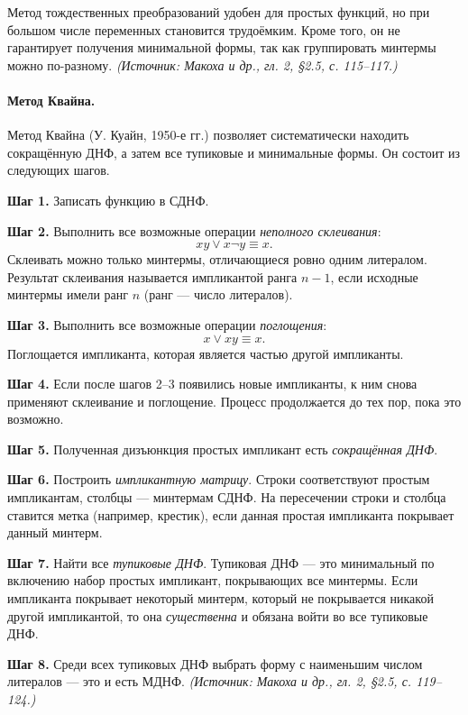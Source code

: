 \documentclass[a4paper,12pt]{article}
\begin{document}
Метод тождественных преобразований удобен для простых функций, но при большом числе переменных становится трудоёмким. Кроме того, он не гарантирует получения минимальной формы, так как группировать минтермы можно по-разному.
\textit{(Источник: Макоха и др., гл. 2, §2.5, с. 115--117.)}

\paragraph{Метод Квайна.}
Метод Квайна (У. Куайн, 1950-е гг.) позволяет систематически находить сокращённую ДНФ, а затем все тупиковые и минимальные формы. Он состоит из следующих шагов.

\textbf{Шаг 1.} Записать функцию в СДНФ.

\textbf{Шаг 2.} Выполнить все возможные операции \emph{неполного склеивания}:
\[
xy\lor x\neg y\equiv x.
\]
Склеивать можно только минтермы, отличающиеся ровно одним литералом. Результат склеивания называется импликантой ранга \(n-1\), если исходные минтермы имели ранг \(n\) (ранг — число литералов).

\textbf{Шаг 3.} Выполнить все возможные операции \emph{поглощения}:
\[
x\lor xy\equiv x.
\]
Поглощается импликанта, которая является частью другой импликанты.

\textbf{Шаг 4.} Если после шагов 2--3 появились новые импликанты, к ним снова применяют склеивание и поглощение. Процесс продолжается до тех пор, пока это возможно.

\textbf{Шаг 5.} Полученная дизъюнкция простых импликант есть \emph{сокращённая ДНФ}.

\textbf{Шаг 6.} Построить \emph{импликантную матрицу}. Строки соответствуют простым импликантам, столбцы — минтермам СДНФ. На пересечении строки и столбца ставится метка (например, крестик), если данная простая импликанта покрывает данный минтерм.

\textbf{Шаг 7.} Найти все \emph{тупиковые ДНФ}. Тупиковая ДНФ — это минимальный по включению набор простых импликант, покрывающих все минтермы. Если импликанта покрывает некоторый минтерм, который не покрывается никакой другой импликантой, то она \emph{существенна} и обязана войти во все тупиковые ДНФ.

\textbf{Шаг 8.} Среди всех тупиковых ДНФ выбрать форму с наименьшим числом литералов — это и есть МДНФ.
\textit{(Источник: Макоха и др., гл. 2, §2.5, с. 119--124.)}
\end{document}
